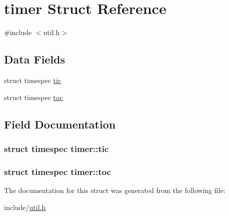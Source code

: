 \hypertarget{structtimer}{\section{timer Struct Reference}
\label{structtimer}
}


{\ttfamily \#include $<$util.\-h$>$}

\subsection*{Data Fields}
\begin{DoxyCompactItemize}
\item 
struct timespec \hyperlink{structtimer_a3b3bc24666d652e8b08827bf9f1bb5fe}{tic}
\item 
struct timespec \hyperlink{structtimer_ab4c6ab94f2ab319c2bb40074686fc2d0}{toc}
\end{DoxyCompactItemize}


\subsection{Field Documentation}
\hypertarget{structtimer_a3b3bc24666d652e8b08827bf9f1bb5fe}{
\subsubsection[{tic}]{\setlength{\rightskip}{0pt plus 5cm}struct timespec timer\-::tic}}\label{structtimer_a3b3bc24666d652e8b08827bf9f1bb5fe}
\hypertarget{structtimer_ab4c6ab94f2ab319c2bb40074686fc2d0}{
\subsubsection[{toc}]{\setlength{\rightskip}{0pt plus 5cm}struct timespec timer\-::toc}}\label{structtimer_ab4c6ab94f2ab319c2bb40074686fc2d0}


The documentation for this struct was generated from the following file\-:\begin{DoxyCompactItemize}
\item 
include/\hyperlink{util_8h}{util.\-h}\end{DoxyCompactItemize}
